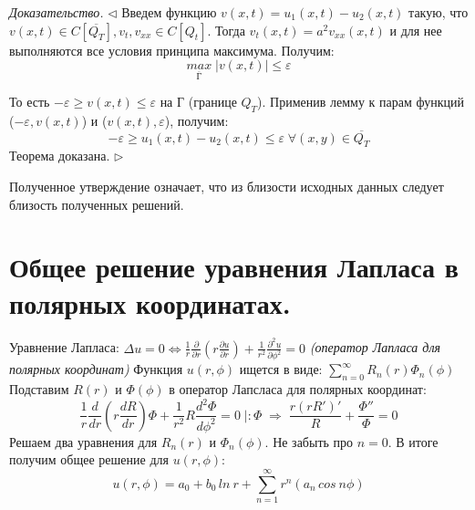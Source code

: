 \documentclass[11pt,a4paper]{article}
\begin{document}
    \textit{Доказательство.} $\triangleleft$ Введем функцию $v(x,t) = u_1(x,t) - u_2(x,t)$ такую, что $v(x,t) \in C[\overline{Q_T}], v_t, v_{xx} \in C[Q_t]$. Тогда $v_t(x,t) = a^2v_{xx}(x,t)$ и для нее выполняются все условия принципа максимума. Получим:
    $$
    \underset{\overline{Г}}{max} \; |v(x,t)| \leqslant \varepsilon
    $$
    
    То есть $-\varepsilon \geqslant v(x,t) \leqslant \varepsilon$ на Г (границе $Q_T$). Применив лемму к парам функций ($-\varepsilon, v(x,t)$) и ($v(x,t), \varepsilon$), получим:
    $$
    -\varepsilon \geqslant u_1(x,t) - u_2(x,t) \leqslant \varepsilon \; \forall (x,y) \in \overline{Q_T}
    $$
    Теорема доказана. $\triangleright$
    
    Полученное утверждение означает, что из близости исходных данных следует близость полученных
решений.
    
    \section{Общее решение уравнения Лапласа в полярных координатах.}
    Уравнение Лапласа: $\Delta u = 0 \Leftrightarrow \frac{1}{r} \frac{\partial}{\partial r}(r \frac{\partial u}{\partial r}) + \frac{1}{r^2} \frac{\partial^2 u}{\partial \phi^2} = 0$ \textit{(оператор Лапласа для полярных координат)}
    Функция $u(r,\phi)$ ищется в виде: $\sum\limits_{n=0}^{\infty} R_n(r)\Phi_n(\phi)$
    Подставим $R(r)$ и $\Phi(\phi)$ в оператор Лапсласа для полярных координат:
    $$
    \frac{1}{r} \frac{d}{dr}(r \frac{dR}{dr})\Phi + \frac{1}{r^2} R \frac{d^2 \Phi}{d \phi^2} = 0 \; |:\Phi \; \Rightarrow \;
    \frac{r(rR')'}{R} + \frac{\Phi''}{\Phi} = 0
    $$
    Решаем два уравнения для $R_n(r)$ и $\Phi_n(\phi)$. Не забыть про $n = 0$. В итоге получим общее решение для $u(r, \phi)$:
    $$
    u(r, \phi) = a_0 + b_0 \, ln\:r + \sum\limits_{n=1}^{\infty}r^n(a_n \, cos \: n \phi)
    $$
    
\end{document}
